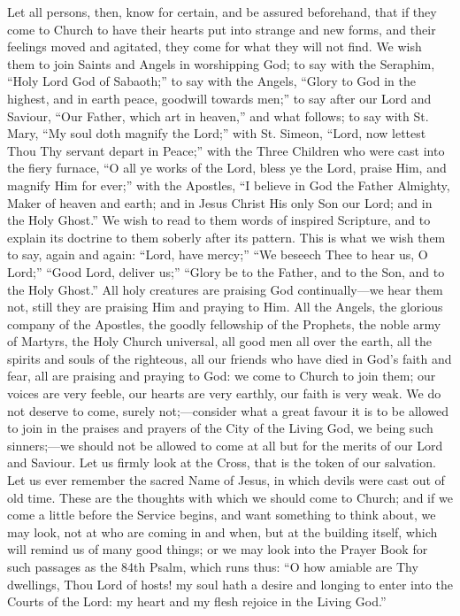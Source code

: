 Let all persons, then, know for certain, and be assured beforehand,
that if they come to Church to have their hearts put into strange and
new forms, and their feelings moved and agitated, they come for what
they will not find. We wish them to join Saints and Angels in
worshipping God; to say with the Seraphim, ``Holy Lord God of
Sabaoth;'' to say with the Angels, ``Glory to God in the
highest, and in earth peace, goodwill towards men;'' to say after
our Lord and Saviour, ``Our Father, which art in heaven,'' and
what follows; to say with St. Mary, ``My soul doth magnify the
Lord;'' with St. Simeon, ``Lord, now lettest Thou Thy servant
depart in Peace;'' with the Three Children who were cast into the
fiery furnace, ``O all ye works of the Lord, bless ye the Lord,
praise Him, and magnify Him for ever;'' with the Apostles, ``I
believe in God the Father Almighty, Maker of heaven and earth; and in
Jesus Christ His only Son our Lord; and in the Holy Ghost.'' We
wish to read to them words of inspired Scripture, and to explain its
doctrine to them soberly after its pattern. This is what we wish them
to say, again and again: ``Lord, have mercy;'' ``We
beseech Thee to hear us, O Lord;'' ``Good Lord, deliver
us;'' ``Glory be to the Father, and to the Son, and to the
Holy Ghost.'' All holy creatures are praising God continually—we
hear them not, still they are praising Him and praying to Him. All the
Angels, the glorious company of the Apostles, the goodly fellowship of
the Prophets, the noble army of Martyrs, the Holy Church universal,
all good men all over the earth, all the spirits and souls of the
righteous, all our friends who have died in God's faith and fear, all
are praising and praying to God: we come to Church to join them; our
voices are very feeble, our hearts are very earthly, our faith is very
weak. We do not deserve to come, surely not;—consider what a great
favour it is to be allowed to join in the praises and prayers of the
City of the Living God, we being such sinners;—we should not be
allowed to come at all but for the merits of our Lord and Saviour. Let
us firmly look at the Cross, that is the token of our salvation. Let
us ever remember the sacred Name of Jesus, in which devils were cast
out of old time. These are the thoughts with which we should come to
Church; and if we come a little before the Service begins, and want
something to think about, we may look, not at who are coming in and
when, but at the building itself, which will remind us of many good
things; or we may look into the Prayer Book for such passages as the
84th Psalm, which runs thus: ``O how amiable are Thy dwellings,
Thou Lord of hosts! my soul hath a desire and longing to enter into
the Courts of the Lord: my heart and my flesh rejoice in the Living
God.''

